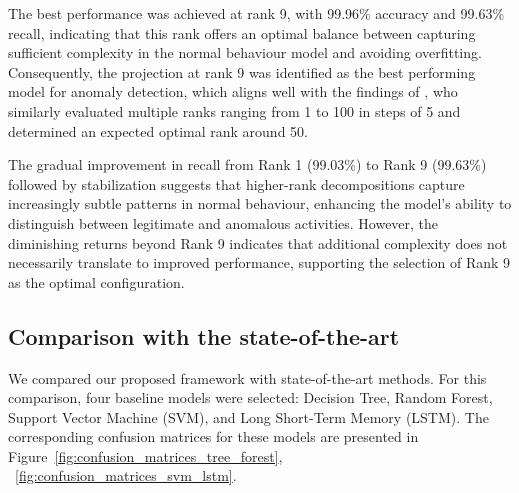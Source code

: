 \documentclass[preprint,12pt,authoryear]{elsarticle}
\begin{document}
The best performance was achieved at rank 9, with 99.96\% accuracy and 99.63\% recall, indicating that this rank offers an optimal balance between capturing sufficient complexity in the normal behaviour model and avoiding overfitting. Consequently, the projection at rank 9 was identified as the best performing model for anomaly detection, which aligns well with the findings of \cite{eren2023general}, who similarly evaluated multiple ranks ranging from 1 to 100 in steps of 5 and determined an expected optimal rank around 50. 

 The gradual improvement in recall from Rank 1 (99.03\%) to Rank 9 (99.63\%) followed by stabilization suggests that higher-rank decompositions capture increasingly subtle patterns in normal behaviour, enhancing the model's ability to distinguish between legitimate and anomalous activities. However, the diminishing returns beyond Rank 9 indicates that additional complexity does not necessarily translate to improved performance, supporting the selection of Rank 9 as the optimal configuration.   

\subsection{Comparison with the state-of-the-art}

We compared our proposed framework with state-of-the-art methods. For this comparison, four baseline models were selected: Decision Tree, Random Forest, Support Vector Machine (SVM), and Long Short-Term Memory (LSTM). The corresponding confusion matrices for these models are presented in Figure~\ref{fig:confusion_matrices_tree_forest}, ~\ref{fig:confusion_matrices_svm_lstm}.
\end{document}
